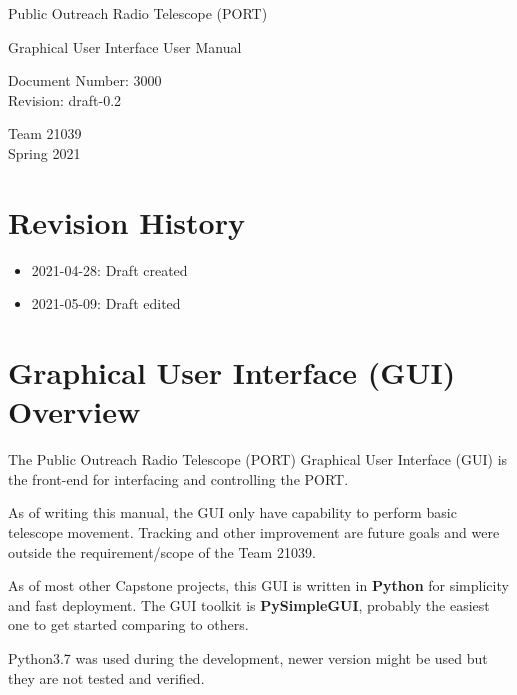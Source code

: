 \documentclass{article}
\begin{document}
\begin{titlepage}
  \begin{center}

    \vspace*{5cm}
    \huge Public Outreach Radio Telescope (PORT)

    \vspace*{2cm}
    \Large Graphical User Interface User Manual

    \vspace*{2cm}
    \large Document Number: 3000\\
    Revision: draft-0.2

    \vspace*{2.0cm}
    \large
    Team 21039\\
    Spring 2021

  \end{center}
\end{titlepage}

\tableofcontents
\pagebreak

\section{Revision History}
\begin{itemize}
  \item 2021-04-28: Draft created
  \item 2021-05-09: Draft edited
\end{itemize}


\section{Graphical User Interface (GUI) Overview}
The Public Outreach Radio Telescope (PORT) Graphical User Interface (GUI) is the front-end for interfacing and controlling the PORT.

As of writing this manual, the GUI only have capability to perform basic telescope movement. Tracking and other improvement are future goals and were outside the requirement/scope of the Team 21039.

As of most other Capstone projects, this GUI is written in \textbf{Python} for simplicity and fast deployment. The GUI toolkit is \textbf{PySimpleGUI}, probably the easiest one to get started comparing to others.

Python3.7 was used during the development, newer version might be used but they are not tested and verified.
\end{document}

